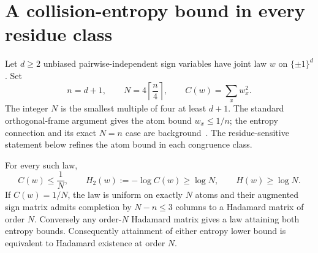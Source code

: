 

\section{A collision-entropy bound in every residue class}
\label{s06:sec:residue-bound}
Let $d\ge2$ unbiased pairwise-independent sign variables have joint
law $w$ on $\{\pm1\}^d$. Set
\[
 n=d+1,\qquad N=4\left\lceil\frac n4\right\rceil,
 \qquad C(w)=\sum_xw_x^2.
\]
The integer $N$ is the smallest multiple of four at least $d+1$.
The standard orthogonal-frame argument gives the atom bound
$w_x\le1/n$; the entropy connection and its exact $N=n$ case are
background~\cite{s06:GP}. The residue-sensitive statement below refines the atom bound in each congruence class.

\begin{theorem}
\label{s06:thm:residue-bound}
For every such law,
\[
 C(w)\le\frac1N,\qquad
 H_2(w):=-\log C(w)\ge\log N,\qquad H(w)\ge\log N.
\]
If $C(w)=1/N$, the law is uniform on exactly $N$ atoms and their
augmented sign matrix admits completion by $N-n\le3$ columns to a
Hadamard matrix of order $N$. Conversely any order-$N$ Hadamard matrix
gives a law attaining both entropy bounds. Consequently attainment
of either entropy lower bound is equivalent to Hadamard existence
at order $N$.
\end{theorem}

